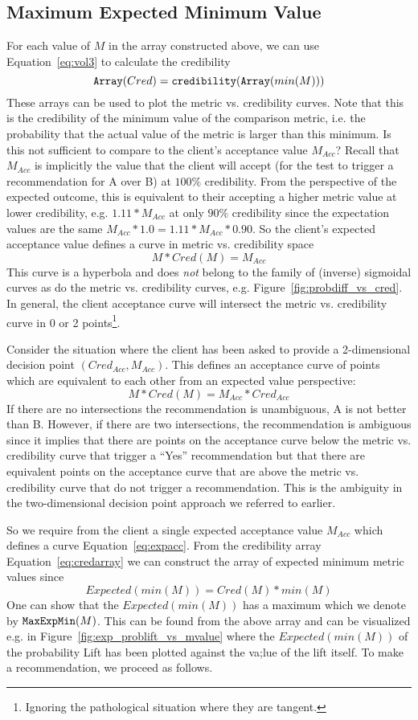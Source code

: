 \documentclass[letterpaper,12pt]{article}
\newcommand{\beq}{\begin{equation}} %
\newcommand{\eeq}{\end{equation}} %
\newcommand{\bdm}{\begin{displaymath}} %
\newcommand{\edm}{\end{displaymath}} %
\begin{document}
\subsection{Maximum Expected Minimum Value}\label{sec:memv}
For each value of \(M\) in the array constructed above, we can use
Equation~\ref{eq:vol3} to calculate the credibility
\beq\label{eq:credarray}
{\tt Array}(Cred) = {\tt credibility(Array}(min(M)))
\eeq
These arrays can be used to plot the metric vs. credibility
curves. Note that this is the credibility of the minimum value of the
comparison metric, i.e. the probability that the actual value of the
metric is larger than this minimum. Is this not sufficient to compare
to the client's acceptance value \(M_{Acc}\)? Recall that \(M_{Acc}\)
is implicitly the value that the client will accept (for the test to
trigger a recommendation for A over B) at \(100\%\) credibility. From
the perspective of the expected outcome, this is equivalent to their
accepting a higher metric value at lower credibility,
e.g. \(1.11*M_{Acc}\) at only \(90\%\) credibility since the
expectation values are the same \(M_{Acc}*1.0 = 1.11*M_{Acc}*
0.90\). So the client's expected acceptance value defines a curve in
metric vs. credibility space
\beq\label{eq:expacc}
M*Cred(M)=M_{Acc}
\eeq
This curve is a hyperbola and does {\em not} belong to the family of
(inverse) sigmoidal curves as do the metric vs. credibility curves,
e.g. Figure~\ref{fig:probdiff_vs_cred}. In general, the client
acceptance curve will intersect the metric vs. credibility curve in 0
or 2 points\footnote{Ignoring the pathological situation where they are
tangent.}.

Consider the situation where the client has been asked to provide a
2-dimensional decision point \((Cred_{Acc},M_{Acc})\). This defines an
acceptance curve of points which are equivalent to each other from an
expected value perspective:
\beq
M*Cred(M)=M_{Acc}*Cred_{Acc}
\eeq
If there are no intersections the recommendation is unambiguous, A is
not better than B. However, if there are two intersections, the
recommendation is ambiguous since it implies that there are points on
the acceptance curve below the metric vs. credibility curve that
trigger a ``Yes'' recommendation but that there are equivalent points on the
acceptance curve that are above the metric vs. credibility curve that
do not trigger a recommendation. This is the ambiguity in the
two-dimensional decision point approach we referred to earlier.

So we require from the client a single expected acceptance value
\(M_{Acc}\) which defines a curve Equation~\ref{eq:expacc}. From the
credibility array Equation~\ref{eq:credarray} we can construct the
array of expected minimum metric values since
\bdm
Expected(min(M)) = Cred(M)*min(M)
\edm
One can show that the \(Expected(min(M))\) has a maximum which we
denote by \({\tt MaxExpMin}(M)\). This can be found from the above
array and can be visualized e.g. in
Figure~\ref{fig:exp_problift_vs_mvalue} where the \(Expected(min(M))\)
of the probability Lift has been plotted against the va;lue of the
lift itself. To make a recommendation, we proceed as follows.
\end{document}

